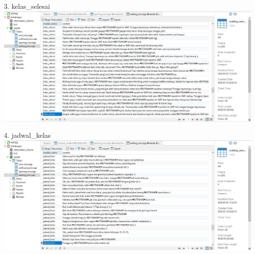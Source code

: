 \documentclass{article}
\begin{document}
            \newline
        \item 3. kelas\_selesai
            \newline
            \includegraphics[scale=0.3]{31.3.jpg}
            \newline
        \item 4. jadwal\_kelas
            \newline
            \includegraphics[scale=0.3]{31.4.jpg}
            \newline
            
\end{document}
